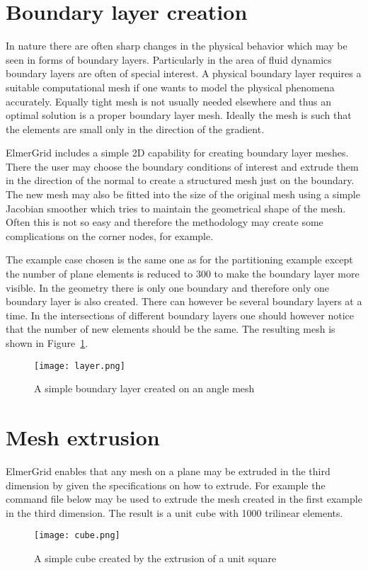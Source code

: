 \section{Boundary layer creation}

In nature there are often sharp changes in the physical 
behavior which may be seen in forms of boundary layers.
Particularly in the area of fluid dynamics boundary layers
are often of special interest. 
A physical boundary layer requires
a suitable computational mesh if one 
wants to model the physical phenomena accurately. 
Equally tight mesh is not usually needed elsewhere and thus
an optimal solution is a proper boundary layer mesh.
Ideally the mesh is such that the elements are small only in the 
direction of the gradient. 

ElmerGrid includes a simple 2D capability for creating boundary layer
meshes. There the user may choose the boundary conditions of interest 
and extrude them in the direction of the normal to create a structured 
mesh just on the boundary. The new mesh may also be fitted into the 
size of the original mesh using a simple Jacobian smoother which
tries to maintain the geometrical shape of the mesh. 
Often this is not so easy and therefore the methodology may create
some complications on the corner nodes, for example.

The example case chosen is the same one as for the 
partitioning example except the number of plane elements is reduced to
300 to make the boundary layer more visible.
In the geometry there is only one boundary and therefore 
only one boundary layer is also created. There can however be several
boundary layers at a time. In the intersections of different boundary
layers one should however notice that the number of new elements should be
the same. The resulting mesh is shown in Figure~\ref{pic51}.
%


\begin{figure}
\begin{center}
\texttt{[image: layer.png]}
\end{center}
\caption{A simple boundary layer created on an angle mesh}
\label{pic51}
\end{figure}

\section{Mesh extrusion}

ElmerGrid enables that any mesh on a plane may be extruded in the 
third dimension by given the specifications on how to extrude.
For example the command file below may be used to extrude the mesh 
created in the first example in the third dimension. The result is a unit 
cube with 1000 trilinear elements.
%

%
\begin{figure}[bh]
\begin{center}
\texttt{[image: cube.png]}
\end{center}
\caption{A simple cube created by the extrusion of a unit square}
\label{pic52}
\end{figure}
